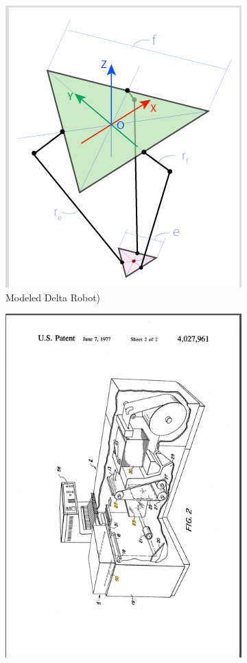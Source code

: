 \documentclass[11pt]{article}
\begin{document}
    \begin{figure}[H]
    \centering
    \begin{subfigure}{.3\textwidth}
      \centering
      \includegraphics[width=.7\linewidth]{Delta_arms.png}
      \caption{Modeled Delta Robot)}
      \label{fig:Delta}
    \end{subfigure}%
    \begin{subfigure}{.3\textwidth}
      \centering
      \includegraphics[width=.7\linewidth]{Printer_Schematic.png}

\end{subfigure}
\end{figure}
\end{document}
